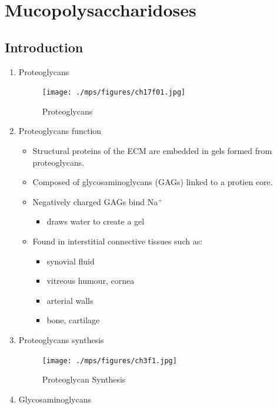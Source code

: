 \documentclass{scrartcl}
\begin{document}
\section{Mucopolysaccharidoses}
\label{sec:org64cc636}
\subsection{Introduction}
\label{sec:orge232521}
\begin{enumerate}
\item Proteoglycans
\label{sec:org43d8e58}

\begin{figure}[htbp]
\centering
\texttt{[image: ./mps/figures/ch17f01.jpg]}
\caption[Proteoglycans]{\label{fig:orgee0a40a}
Proteoglycans}
\end{figure}

\item Proteoglycans function
\label{sec:org4ce30a8}

\begin{itemize}
\item Structural proteins of the ECM are embedded in gels formed from
proteoglycans.
\item Composed of glycosaminoglycans (GAGs) linked to a protien core.
\item Negatively charged GAGs bind Na\(^{\text{+}}\)
\begin{itemize}
\item draws water to create a gel
\end{itemize}
\item Found in interstitial connective tissues such as: 
\begin{itemize}
\item synovial fluid
\item vitreous humour, cornea
\item arterial walls
\item bone, cartilage
\end{itemize}
\end{itemize}

\item Proteoglycans synthesis
\label{sec:orgc095065}

\begin{figure}[htbp]
\centering
\texttt{[image: ./mps/figures/ch3f1.jpg]}
\caption[Proteoglycan Synthesis]{\label{fig:org9aec9f6}
Proteoglycan Synthesis}
\end{figure}


\item Glycosaminoglycans
\label{sec:org981c947}


\end{enumerate}
\end{document}
